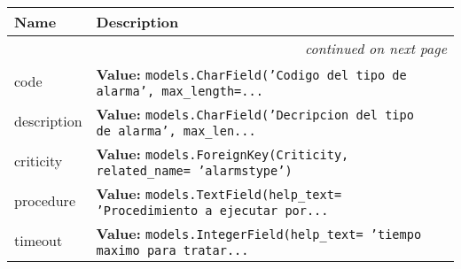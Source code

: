     \vspace{-1cm}
\hspace{\varindent}\begin{longtable}{|p{\varnamewidth}|p{\vardescrwidth}|l}
\cline{1-2}
\cline{1-2} \centering \textbf{Name} & \centering \textbf{Description}& \\
\cline{1-2}
\endhead\cline{1-2}\multicolumn{3}{r}{\small\textit{continued on next page}}\\\endfoot\cline{1-2}
\endlastfoot\raggedright c\-o\-d\-e\- & \raggedright \textbf{Value:} 
{\tt models.CharField('Codigo del tipo de alarma', max\_length=\texttt{...}}&\\
\cline{1-2}
\raggedright d\-e\-s\-c\-r\-i\-p\-t\-i\-o\-n\- & \raggedright \textbf{Value:} 
{\tt models.CharField('Decripcion del tipo de alarma', max\_len\texttt{...}}&\\
\cline{1-2}
\raggedright c\-r\-i\-t\-i\-c\-i\-t\-y\- & \raggedright \textbf{Value:} 
{\tt models.ForeignKey(Criticity, related\_name= 'alarmstype')}&\\
\cline{1-2}
\raggedright p\-r\-o\-c\-e\-d\-u\-r\-e\- & \raggedright \textbf{Value:} 
{\tt models.TextField(help\_text= 'Procedimiento a ejecutar por\texttt{...}}&\\
\cline{1-2}
\raggedright t\-i\-m\-e\-o\-u\-t\- & \raggedright \textbf{Value:} 
{\tt models.IntegerField(help\_text= 'tiempo maximo para tratar\texttt{...}}&\\
\cline{1-2}
\end{longtable}

